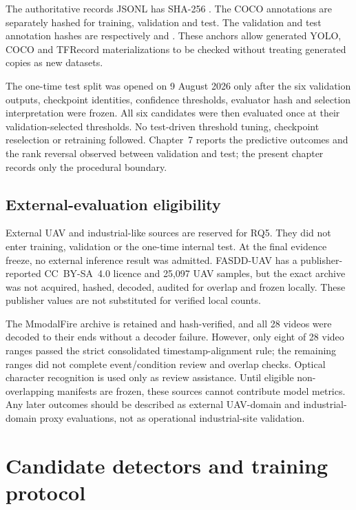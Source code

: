 The authoritative records JSONL has SHA-256
.
The COCO annotations are separately hashed for training, validation and test.
The validation and test annotation hashes are respectively
and
.
These anchors allow generated YOLO, COCO and TFRecord materializations to be
checked without treating generated copies as new datasets.

The one-time test split was opened on 9 August 2026 only after the six
validation outputs, checkpoint identities, confidence thresholds, evaluator
hash and selection interpretation were frozen. All six candidates were then
evaluated once at their validation-selected thresholds. No test-driven
threshold tuning, checkpoint reselection or retraining followed. Chapter~7
reports the predictive outcomes and the rank reversal observed between
validation and test; the present chapter records only the procedural boundary.

\subsection{External-evaluation eligibility}

External UAV and industrial-like sources are reserved for RQ5. They did not
enter training, validation or the one-time internal test. At the final evidence
freeze, no external inference result was admitted. FASDD-UAV has a
publisher-reported CC~BY-SA~4.0 licence and 25,097 UAV samples, but the exact
archive was not acquired, hashed, decoded, audited for overlap and
frozen locally. These publisher values are not substituted for verified local
counts.

The MmodalFire archive is retained and hash-verified, and all 28 videos were
decoded to their ends without a decoder failure. However, only eight of 28
video ranges passed the strict consolidated timestamp-alignment rule; the
remaining ranges did not complete event/condition review and overlap checks.
Optical
character recognition is used only as review assistance. Until eligible
non-overlapping manifests are frozen, these sources cannot contribute model
metrics. Any later outcomes should be described as external UAV-domain and
industrial-domain proxy evaluations, not as operational industrial-site
validation.

\section{Candidate detectors and training protocol}
\label{sec:data-models:4}

